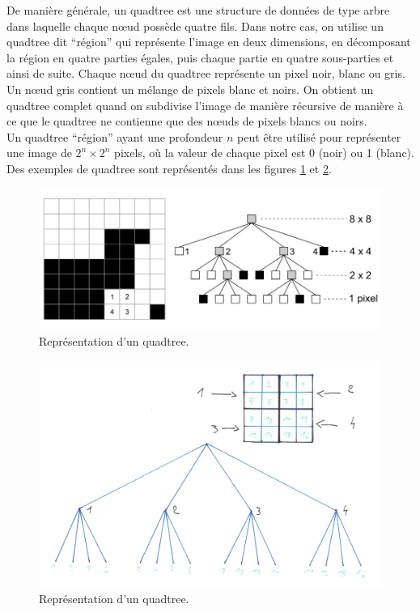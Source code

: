 De manière générale, un quadtree est une structure de données de type arbre dans laquelle chaque nœud possède quatre fils. Dans notre cas, on utilise un quadtree dit \enquote{région} qui représente l'image en deux dimensions, en décomposant la région en quatre parties égales, puis chaque partie en quatre sous-parties et ainsi de suite. Chaque nœud du quadtree représente un pixel noir, blanc ou gris. Un nœud gris contient un mélange de pixels blanc et noirs. On obtient un quadtree complet quand on subdivise l'image de manière récursive de manière à ce que le quadtree ne contienne que des nœuds de pixels blancs ou noirs.\\

Un quadtree \enquote{région} ayant une profondeur $n$ peut être utilisé pour représenter une image de $2^{n}\times2^{n}$ pixels, où la valeur de chaque pixel est 0 (noir) ou 1 (blanc). Des exemples de quadtree sont représentés dans les figures \ref{fig:quadtree} et \ref{fig:quadtree2}.

\begin{figure}[H]
	\centering
	\includegraphics[scale=0.8]{images/quadtree.png}
	\caption{Représentation d'un quadtree.}
	\label{fig:quadtree}
\end{figure}

\begin{figure}[H]
	\centering
	\includegraphics[scale=0.4]{images/quadtree-dessin.jpg}
	\caption{Représentation d'un quadtree.}
	\label{fig:quadtree2}
\end{figure}

